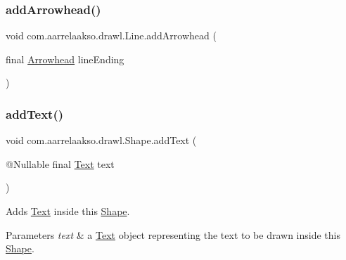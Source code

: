 \mbox{\label{classcom_1_1aarrelaakso_1_1drawl_1_1_line_a7c54922855fda2590c962ac8e03c220c}} 
\subsubsection{\texorpdfstring{add\+Arrowhead()}{addArrowhead()}}
{\footnotesize\ttfamily void com.\+aarrelaakso.\+drawl.\+Line.\+add\+Arrowhead (\begin{DoxyParamCaption}\item[{final \hyperlink{classcom_1_1aarrelaakso_1_1drawl_1_1_arrowhead}{Arrowhead}}]{lineEnding }\end{DoxyParamCaption})}

\mbox{\label{classcom_1_1aarrelaakso_1_1drawl_1_1_shape_af6fea9610721de462c18ee640043aba7}} 
\subsubsection{\texorpdfstring{add\+Text()}{addText()}}
{\footnotesize\ttfamily void com.\+aarrelaakso.\+drawl.\+Shape.\+add\+Text (\begin{DoxyParamCaption}\item[{@Nullable final \hyperlink{classcom_1_1aarrelaakso_1_1drawl_1_1_text}{Text}}]{text }\end{DoxyParamCaption})\hspace{0.3cm}{\ttfamily [inherited]}}



Adds \hyperlink{classcom_1_1aarrelaakso_1_1drawl_1_1_text}{Text} inside this \hyperlink{classcom_1_1aarrelaakso_1_1drawl_1_1_shape}{Shape}. 


\begin{DoxyParams}{Parameters}
{\em text} & a \hyperlink{classcom_1_1aarrelaakso_1_1drawl_1_1_text}{Text} object representing the text to be drawn inside this \hyperlink{classcom_1_1aarrelaakso_1_1drawl_1_1_shape}{Shape}. \\
\hline
\end{DoxyParams}
\mbox{\label{classcom_1_1aarrelaakso_1_1drawl_1_1_line_ae037bf2dd2bb2a21ba2d45a752cad9f5}} 
